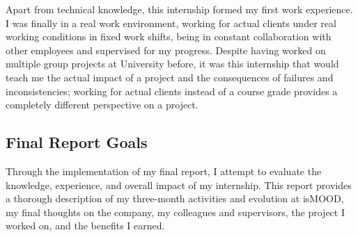 Apart from technical knowledge,
this internship formed my first work experience.
I was finally in a real work environment,
working for actual clients
under real working conditions
in fixed work shifts,
being in constant collaboration with other employees
and supervised for my progress.
Despite having worked on multiple group projects
at University before,
it was this internship that would teach me
the actual impact of a project
and the consequences of failures and inconsistencies;
working for actual clients instead of a course grade
provides a completely different perspective on a project.

\subsection{Final Report Goals}
\label{subsec:report-goals}

Through the implementation of my final report,
I attempt to evaluate the knowledge, experience,
and overall impact of my internship.
This report provides a thorough description
of my three-month activities and evolution at isMOOD,
my final thoughts on the company,
my colleagues and supervisors,
the project I worked on, and
the benefits I earned.
